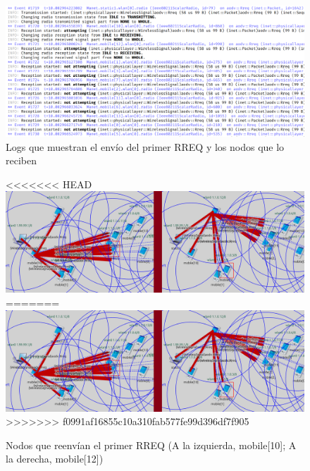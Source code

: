 \begin{figure}[H]
    \centering
    \includegraphics[width=125mm, scale=0.75]{imaxes/aodv/ejercicio1_1.png}
    \caption{Logs que muestran el envío del primer RREQ y los nodos que lo reciben}
    \label{fig:primer_rreq_reception}
\end{figure}

\begin{figure}[H]
    \centering
<<<<<<< HEAD
    \includegraphics[width=125mm, scale=0.75]{imaxes/ejercicio1_2.png}
=======
    \includegraphics[width=125mm, scale=0.75]{imaxes/aodv/ejercicio1_2.png}
>>>>>>> f0991af16855c10a310fab577fe99d396df7f905
    \caption{Nodos que reenvían el primer RREQ (A la izquierda, mobile[10]; A la derecha, mobile[12])}
    \label{fig:primer_rreq_transmission}
\end{figure}

